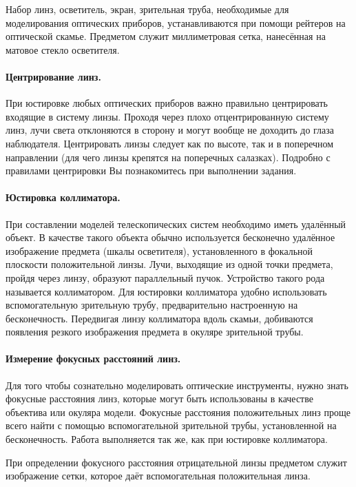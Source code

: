 Набор линз, осветитель, экран, зрительная труба, необходимые для моделирования оптических 
приборов, устанавливаются при помощи рейтеров на оптической скамье. Предметом служит миллиметровая 
сетка, нанесённая на матовое стекло осветителя.

\paragraph{Центрирование линз.}

При юстировке любых оптических приборов важно правильно центрировать входящие в систему линзы. 
Проходя через плохо отцентрированную систему линз, лучи света отклоняются в
сторону и могут вообще не доходить до глаза наблюдателя. Центрировать линзы следует как по высоте, 
так и в поперечном направлении (для чего линзы крепятся на поперечных салазках). Подробно с правилами
центрировки Вы познакомитесь при выполнении задания.

\paragraph{Юстировка коллиматора.}

При составлении моделей телескопических систем необходимо иметь удалённый объект. В качестве 
такого объекта обычно используется бесконечно удалённое изображение предмета (шкалы осветителя), 
установленного в фокальной плоскости положительной линзы. Лучи, выходящие из одной точки предмета, 
пройдя через линзу, образуют параллельный пучок. Устройство такого рода называется
коллиматором. Для юстировки коллиматора удобно использовать вспомогательную зрительную трубу, 
предварительно настроенную на бесконечность. Передвигая линзу коллиматора вдоль скамьи, 
добиваются появления резкого изображения предмета в окуляре зрительной трубы.

\paragraph{Измерение фокусных расстояний линз.}

Для того чтобы сознательно моделировать оптические инструменты, нужно знать фокусные расстояния линз,
которые могут быть использованы в качестве объектива или окуляра модели. Фокусные расстояния 
положительных линз проще всего найти с помощью вспомогательной зрительной трубы, установленной на 
бесконечность. Работа выполняется так же, как при юстировке коллиматора.

При определении фокусного расстояния отрицательной линзы предметом служит изображение сетки, 
которое даёт вспомогательная положительная линза.